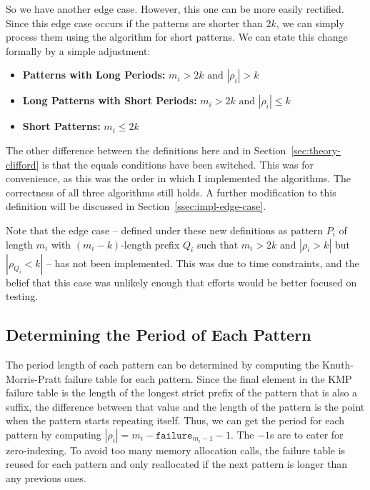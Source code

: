 \documentclass[ %
                    author={Dominic Joseph Moylett},
                    degree={MEng},
                     title={Dictionary Matching with Fingerprints},
                  subtitle={An Empirical Analysis},
                      type={research},
                      year={2015} ]{dissertation}
\begin{document}
So we have another edge case. However, this one can be more easily rectified. Since this edge case occurs if the patterns are shorter than $2k$, we can simply process them using the algorithm for short patterns. We can state this change formally by a simple adjustment:

\begin{itemize}
  \item \textbf{Patterns with Long Periods:} $m_i > 2k \text{ and } |\rho_i| > k$
  \item \textbf{Long Patterns with Short Periods:} $m_i > 2k \text{ and } |\rho_i| \leq k$
  \item \textbf{Short Patterns:} $m_i \leq 2k$
\end{itemize}

The other difference between the definitions here and in Section~\ref{sec:theory-clifford} is that the equals conditions have been switched. This was for convenience, as this was the order in which I implemented the algorithms. The correctness of all three algorithms still holds. A further modification to this definition will be discussed in Section~\ref{ssec:impl-edge-case}.

Note that the edge case -- defined under these new definitions as pattern $P_i$ of length $m_i$ with $(m_i - k)$-length prefix $Q_i$ such that $m_i > 2k \text{ and } |\rho_i > k|$ but $|\rho_{Q_i} < k|$ -- has not been implemented. This was due to time constraints, and the belief that this case was unlikely enough that efforts would be better focused on testing.

\subsection{Determining the Period of Each Pattern}

The period length of each pattern can be determined by computing the Knuth-Morris-Pratt failure table \cite{kmp} for each pattern. Since the final element in the KMP failure table is the length of the longest strict prefix of the pattern that is also a suffix, the difference between that value and the length of the pattern is the point when the pattern starts repeating itself. Thus, we can get the period for each pattern by computing $|\rho_i| = m_i - \texttt{failure}_{m_i - 1} - 1$. The $-1$s are to cater for zero-indexing. To avoid too many memory allocation calls, the failure table is reused for each pattern and only reallocated if the next pattern is longer than any previous ones.
\end{document}
